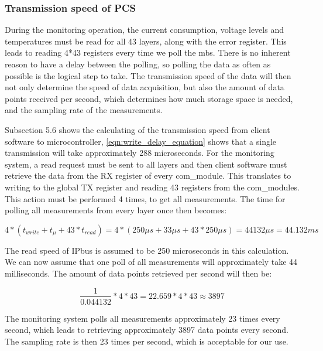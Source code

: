 \documentclass[main.tex]{subfiles}
\begin{document}
\subsubsection{Transmission speed of PCS}
During the monitoring operation, the current consumption, voltage levels and temperatures must be read for all 43 layers, along with the error register. This leads to reading 4*43 registers every time we poll the \gls{mb}s. There is no inherent reason to have a delay between the polling, so polling the data as often as possible is the logical step to take. The transmission speed of the data will then not only determine the speed of data acquisition, but also the amount of data points received per second, which determines how much storage space is needed, and the sampling rate of the measurements.

Subsection 5.6 shows the calculating of the transmission speed from client software to microcontroller, \autoref{eqn:write_delay_equation} shows that a single transmission will take approximately 288 microseconds. For the monitoring system, a read request must be sent to all layers and then client software must retrieve the data from the RX register of every com\_module. This translates to writing to the global TX register and reading 43 registers from the com\_modules. This action must be performed 4 times, to get all measurements. The time for polling all measurements from every layer once then becomes:

\begin{equation} \label{eqn:monitoring_timing}
4*(t_{write}+t_{\mu } + 43*t_{read}) = 4*(250\mu s + 33 \mu s + 43*250\mu s) = 44132 \mu s = 44.132 ms
\end{equation}

The read speed of IPbus is assumed to be 250 microseconds in this calculation. We can now assume that one poll of all measurements will approximately take 44 milliseconds. The amount of data points retrieved per second will then be:

\begin{equation} \label{eqn:data_points_per_second}
\frac{1}{0.044132}*4*43 =  22.659 * 4*43 \approx 3897
\end{equation}

The monitoring system polls all measurements approximately 23 times every second, which leads to retrieving approximately 3897 data points every second. The sampling rate is then 23 times per second, which is acceptable for our use.
\end{document}
